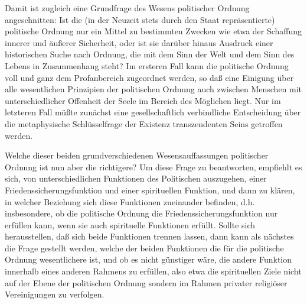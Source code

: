 Damit ist zugleich eine Grundfrage des Wesens politischer Ordnung
angeschnitten: Ist die (in der Neuzeit stets durch den Staat
repräsentierte) politische Ordnung nur ein Mittel zu bestimmten Zwecken
wie etwa der Schaffung innerer und äußerer Sicherheit, oder ist sie
darüber hinaus Ausdruck einer historischen Suche nach Ordnung, die mit
dem Sinn der Welt und dem Sinn des Lebens in Zusammenhang steht? Im
ersteren Fall kann die politische Ordnung voll und ganz dem
Profanbereich zugeordnet werden, so daß eine Einigung über alle
wesentlichen Prinzipien der politischen Ordnung auch zwischen Menschen
mit unterschiedlicher Offenheit der Seele im Bereich des Möglichen
liegt. Nur im letzteren Fall müßte zunächst eine gesellschaftlich
verbindliche Entscheidung über die metaphysische Schlüsselfrage der
Existenz transzendenten Seins getroffen werden.

Welche dieser beiden grundverschiedenen Wesensauffassungen politischer Ordnung
ist nun aber die richtigere? Um diese Frage zu beantworten, empfiehlt es sich,
von unterschiedlichen Funktionen des Politischen auszugehen, einer
Friedenssicherungsfunktion und einer spirituellen Funktion, und dann zu
klären, in welcher Beziehung sich diese Funktionen zueinander befinden, d.h. 
insbesondere, ob die politische Ordnung die Friedenssicherungsfunktion nur
erfüllen kann, wenn sie auch spirituelle Funktionen erfüllt. Sollte sich
herausstellen, daß sich beide Funktionen trennen lassen, dann kann als
nächstes die Frage gestellt werden, welche der beiden Funktionen die für
die politische Ordnung wesentlichere ist, und ob es nicht günstiger
wäre, die andere Funktion innerhalb eines anderen Rahmens zu erfüllen,
also etwa die spirituellen Ziele nicht auf der Ebene der politischen Ordnung
sondern im Rahmen privater religiöser Vereinigungen zu verfolgen.  

